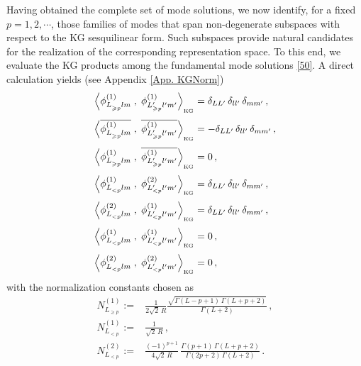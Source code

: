 \documentclass[aps,twocolumn,nofootinbib]{revtex4}
\begin{document}
Having obtained the complete set of mode solutions, we now identify, for a fixed $p=1,2,\cdots$, those families of modes that span non-degenerate subspaces with respect to the KG sesquilinear form. Such subspaces provide natural candidates for the realization of the corresponding representation space. To this end, we evaluate the KG products among the fundamental mode solutions \eqref{50}. A direct calculation yields (see Appendix \ref{App. KGNorm})
\begin{align}
    \left\langle \phi^{(1)}_{L^{}_{\geqslant p}lm} \;,\; \phi^{(1)}_{L^\prime_{\geqslant p}l^\prime_{}m^\prime_{}}\right\rangle_{\vphantom{}_{\text{KG}}} &= \delta_{LL_{}^\prime} \,\delta_{ll_{}^\prime} \,\delta_{mm_{}^\prime} \,, \label{kha30}\\[3pt]
    \left\langle \overline{\phi^{(1)}_{L^{}_{\geqslant p}lm}} \;,\; \overline{\phi^{(1)}_{L^\prime_{\geqslant p}l^\prime_{}m^\prime_{}}}\right\rangle_{\vphantom{}_{\text{KG}}} &= - \delta_{LL_{}^\prime} \,\delta_{ll_{}^\prime} \,\delta_{mm_{}^\prime} \,, \label{kha30'}\\[3pt]
    \left\langle \phi^{(1)}_{L^{}_{\geqslant p}lm} \;,\; \overline{\phi^{(1)}_{L^\prime_{\geqslant p}l^\prime_{}m^\prime_{}}}\right\rangle_{\vphantom{}_{\text{KG}}} &= 0 \,, \label{miriamDBD}\\[3pt]
    \left\langle \phi^{(1)}_{L_{<p}^{}lm}\;,\;  \phi^{(2)}_{L_{<p}^\prime l_{}^\prime m_{}^\prime} \right\rangle_{\vphantom{}_{\text{KG}}} &= \delta_{LL_{}^\prime} \,\delta_{ll_{}^\prime} \,\delta_{mm_{}^\prime} \,, \label{kha27} \\[3pt]
    \left\langle \phi^{(2)}_{L_{<p}^{}lm}\;,\;  \phi^{(1)}_{L_{<p}^\prime l_{}^\prime m_{}^\prime} \right\rangle_{\vphantom{}_{\text{KG}}} &= \delta_{LL_{}^\prime} \,\delta_{ll_{}^\prime} \,\delta_{mm_{}^\prime} \,, \label{kha27'} \\[3pt]
    \left\langle \phi^{(1)}_{L_{<p}^{}lm}\;,\;  \phi^{(1)}_{L_{<p}^\prime l_{}^\prime m_{}^\prime} \right\rangle_{\vphantom{}_{\text{KG}}} &= 0 \,, \label{thelastone} \\[3pt]
    \left\langle \phi^{(2)}_{L_{<p}^{}lm}\;,\;  \phi^{(2)}_{L_{<p}^\prime l_{}^\prime m_{}^\prime} \right\rangle_{\vphantom{}_{\text{KG}}} &= 0 \,, \label{thelastone'}
\end{align}
with the normalization constants chosen as
\begin{align}
    N_{L^{}_{\geqslant p}}^{(1)} := &\frac{1}{2\sqrt{2}\, R}\frac{\sqrt{\Gamma(L-p+1) \,\Gamma(L+p+2)}}{\Gamma(L+2)}\,, \label{normalization constants1} \\[3pt]
    N_{L_{<p}^{}}^{(1)} :=& \frac{1}{\sqrt{2}\, R} \,, \label{normalization constants2} \\[3pt]
    N_{L_{<p}^{}}^{(2)} :=& \frac{(-1)^{p+1}}{4\sqrt{2}\, R}\, \frac{\Gamma(p+1) \,\Gamma(L+p+2)}{\Gamma(2p+2)\, \Gamma(L+2)} \,. \label{normalization constants3}
\end{align}
\end{document}
